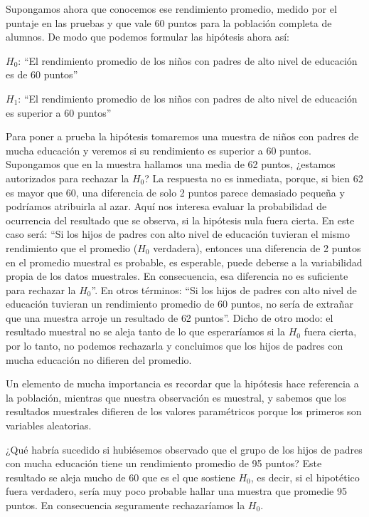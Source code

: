 \documentclass[]{book}
\begin{document}
Supongamos ahora que conocemos ese rendimiento promedio, medido por el
puntaje en las pruebas y que vale 60 puntos para la población completa
de alumnos. De modo que podemos formular las hipótesis ahora así:

\(H_{0}\): ``El rendimiento promedio de los niños con padres de alto nivel de educación es de 60 puntos''

\(H_{1}\): ``El rendimiento promedio de los niños con padres de alto nivel de educación es superior a 60 puntos''

Para poner a prueba la hipótesis tomaremos una muestra de niños con
padres de mucha educación y veremos si su rendimiento es superior a 60
puntos. Supongamos que en la muestra hallamos una media de 62 puntos,
¿estamos autorizados para rechazar la \(H_{0}\)? La respuesta no es inmediata, porque, si bien 62 es mayor que 60, una diferencia de solo 2 puntos parece demasiado pequeña y podríamos atribuirla al azar. Aquí nos interesa evaluar la probabilidad de ocurrencia del resultado que se
observa, si la hipótesis nula fuera cierta. En este caso será: ``Si los
hijos de padres con alto nivel de educación tuvieran el mismo
rendimiento que el promedio (\(H_{0}\) verdadera), entonces una diferencia de 2 puntos en el promedio muestral es probable, es esperable, puede deberse a la variabilidad propia de los datos muestrales. En consecuencia, esa diferencia no es suficiente para rechazar la \(H_{0}\)''. En otros términos: ``Si los hijos de padres con alto nivel de educación tuvieran un rendimiento promedio de 60 puntos, no sería de extrañar que una muestra arroje un resultado de 62 puntos''. Dicho de otro modo: el resultado muestral no se aleja tanto de lo que esperaríamos si la \(H_{0}\) fuera cierta, por lo tanto, no podemos rechazarla y concluimos que los hijos de padres con mucha educación no difieren del promedio.

Un elemento de mucha importancia es recordar que la hipótesis hace
referencia a la población, mientras que nuestra observación es muestral, y sabemos que los resultados muestrales difieren de los valores paramétricos porque los primeros son variables aleatorias.

¿Qué habría sucedido si hubiésemos observado que el grupo de los hijos
de padres con mucha educación tiene un rendimiento promedio de 95
puntos? Este resultado se aleja mucho de 60 que es el que sostiene \(H_{0}\), es decir, si el hipotético fuera verdadero, sería muy poco probable hallar una muestra que promedie 95 puntos. En consecuencia seguramente rechazaríamos la \(H_{0}\).
\end{document}
